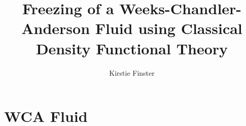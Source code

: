 \documentclass{beamer}
\title[Freezing a WCA Fluid using cDFT]{Freezing of a Weeks-Chandler-Anderson 
       Fluid using Classical Density Functional Theory}
\author{Kirstie Finster}
\begin{document}


\begin{frame}
	\titlepage
\end{frame}


\section*{WCA Fluid}

\end{document}
